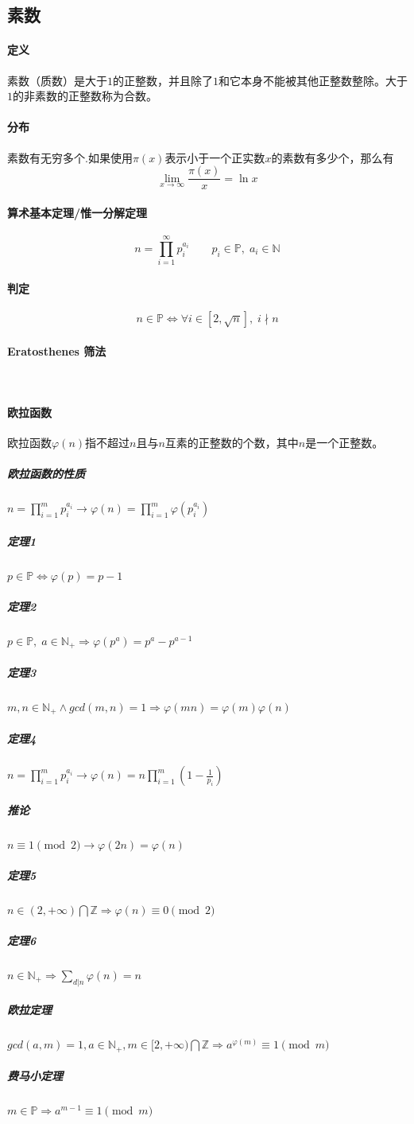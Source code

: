 \documentclass[]{cpp}
\begin{document}
\subsection{素数}
\paragraph{定义}
	素数（质数）是大于$1$的正整数，并且除了$1$和它本身不能被其他正整数整除。大于$1$的非素数的正整数称为合数。
\paragraph{分布}
	素数有无穷多个.如果使用$\pi(x)$表示小于一个正实数$x$的素数有多少个，那么有$$\lim\limits_{x\rightarrow{\infty}}\frac{\pi(x)}{x}=\ln{x}$$
\paragraph{算术基本定理/惟一分解定理}
	$$n=\prod\limits_{i=1}^\infty p_i^{a_i} \qquad p_i\in\mathbb{P},\;a_i\in\mathbb{N}$$
\paragraph{判定}
	$$n\in\mathbb{P}\iff\forall i\in[2,\sqrt{n}],\;i\nmid n$$
\paragraph{Eratosthenes 筛法} $ $
\paragraph{欧拉函数} 欧拉函数$\varphi(n)$指不超过$n$且与$n$互素的正整数的个数，其中$n$是一个正整数。
\subparagraph{欧拉函数的性质} $n=\prod\limits_{i=1}^m p_i^{a_i}\to\varphi(n)=\prod\limits_{i=1}^m\varphi(p_i^{a_i})$
\subparagraph{定理1} $p\in\mathbb{P}\iff\varphi(p)=p-1$
\subparagraph{定理2} $p\in\mathbb{P},\;a\in\mathbb{N_+}\Rightarrow\varphi(p^a)=p^{a}-p^{a-1}$
\subparagraph{定理3} $m,n\in\mathbb{N_+}\land gcd(m,n)=1\Rightarrow\varphi(mn)=\varphi(m)\varphi(n)$
\subparagraph{定理4} $n=\prod\limits_{i=1}^m p_i^{a_i}\to\varphi(n)=n\prod\limits_{i=1}^{m}(1-\frac{1}{p_i})$
\subparagraph{推论} $n\equiv1\pmod2\to\varphi(2n)=\varphi(n)$
\subparagraph{定理5} $n\in(2,+\infty)\bigcap\mathbb{Z}\Rightarrow\varphi(n)\equiv0\pmod2$
\subparagraph{定理6} $n\in\mathbb{N_+}\Rightarrow\sum\limits_{d|n}\varphi(n)=n$
\subparagraph{欧拉定理} $gcd(a,m)=1,a\in\mathbb{N_+},m\in[2,+\infty)\bigcap\mathbb{Z}\Rightarrow a^{\varphi(m)}\equiv1\pmod{m}$
\subparagraph{费马小定理} $m\in\mathbb{P}\Rightarrow a^{m-1}\equiv1\pmod{m}$
\end{document}
